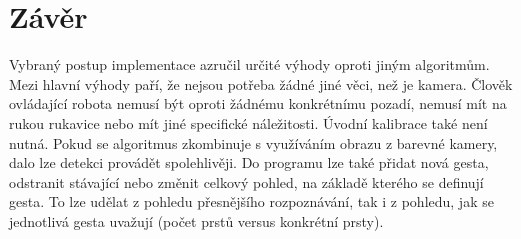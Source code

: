 \chapter{Závěr}
Vybraný postup implementace azručil určité výhody oproti jiným algoritmům. Mezi hlavní výhody paří, že nejsou potřeba žádné jiné věci, než je kamera. Člověk ovládající robota nemusí  být oproti žádnému konkrétnímu pozadí, nemusí mít na rukou rukavice nebo mít jiné specifické náležitosti. Úvodní kalibrace také není nutná. 
Pokud se algoritmus zkombinuje s využíváním obrazu z barevné kamery, dalo lze detekci provádět spolehlivěji.
Do programu lze také přidat nová gesta, odstranit stávající nebo změnit celkový pohled, na základě kterého se definují gesta. To lze udělat z pohledu přesnějšího rozpoznávání, tak i z pohledu, jak se jednotlivá gesta uvažují (počet prstů versus konkrétní prsty).



\endinput
